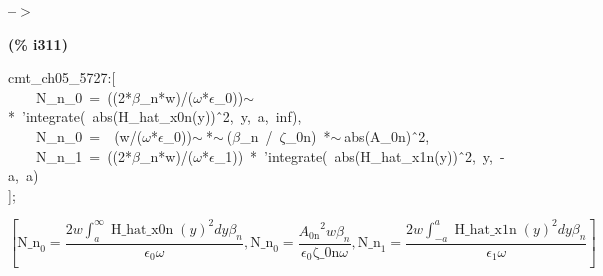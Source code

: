 \documentclass[fleqn]{article}
\begin{document}
\noindent
\begin{minipage}[t]{4.000000em}\color{red}\bfseries
 --\ensuremath{\ensuremath{>}}	
\end{minipage}
\begin{minipage}[t]{\textwidth}\color{blue}

\end{minipage}

\noindent%



\noindent
\begin{minipage}[t]{4.000000em}\color{red}\bfseries
(\% i311)	
\end{minipage}
\begin{minipage}[t]{\textwidth}\color{blue}
cmt\_ch05\_5727:[\\
\ \ \ \ N\_n\_0\ =\ ((2*\ensuremath{\beta}\_n*w)/(\ensuremath{\omega}*\ensuremath{\epsilon}\_0))\ensuremath{\sim\ }*\ 'integrate(\ abs(H\_hat\_x0n(y))\^\ 2,\ y,\ a,\ inf),\\
\ \ \ \ N\_n\_0\ =\ \ (w/(\ensuremath{\omega}*\ensuremath{\epsilon}\_0))\ensuremath{\sim\ }*\ensuremath{\sim\ }(\ensuremath{\beta}\_n\ /\ \ensuremath{\zeta}\_0n)\ *\ensuremath{\sim\ }abs(A\_0n)\^\ 2,\\
\ \ \ \ N\_n\_1\ =\ ((2*\ensuremath{\beta}\_n*w)/(\ensuremath{\omega}*\ensuremath{\epsilon}\_1))\ *\ 'integrate(\ abs(H\_hat\_x1n(y))\^\ 2,\ y,\ -a,\ a)\ \ \ \\
];
\end{minipage}
\[\displaystyle \tag{\% o311} 
\operatorname{[}{{\ensuremath{\mathrm{N\_ n}}}_0}=\frac{2 w \int_{a}^{\infty }{\left. {{\operatorname{H\_ hat\_ x0n}(y)}^{2}}dy\right.} {{\beta }_n}}{{{\epsilon }_0} \omega }\operatorname{,}{{\ensuremath{\mathrm{N\_ n}}}_0}=\frac{{{{A_{\ensuremath{\mathrm{0n}}}}}^{2}} w {{\beta }_n}}{{{\epsilon }_0} \ensuremath{\mathrm{\zeta \_ 0n}} \omega }\operatorname{,}{{\ensuremath{\mathrm{N\_ n}}}_1}=
\frac{2 w \int_{-a}^{a}{\left. {{\operatorname{H\_ hat\_ x1n}(y)}^{2}}dy\right.} {{\beta }_n}}{{{\epsilon }_1} \omega }\operatorname{]}\mbox{}
\]
\end{document}

